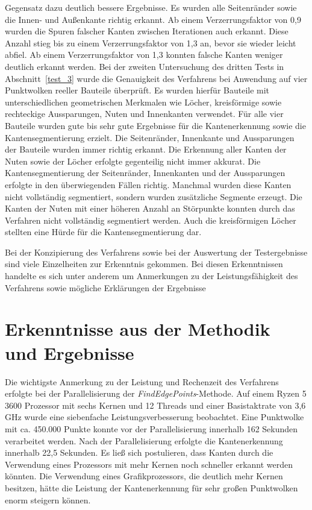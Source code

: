 Gegensatz dazu deutlich bessere Ergebnisse. Es wurden alle Seitenränder sowie die Innen- und Außenkante richtig erkannt. Ab einem Verzerrungsfaktor von 0,9 wurden die Spuren falscher Kanten zwischen Iterationen auch erkannt. Diese Anzahl stieg bis zu einem Verzerrungsfaktor von 1,3 an, bevor sie wieder leicht abfiel. Ab einem Verzerrungsfaktor von 1,3 konnten falsche Kanten weniger deutlich erkannt werden. Bei der zweiten Untersuchung des dritten Tests in Abschnitt~\ref{test_3} wurde die Genauigkeit des Verfahrens bei Anwendung auf vier Punktwolken reeller Bauteile überprüft. Es wurden hierfür Bauteile mit unterschiedlichen geometrischen Merkmalen wie Löcher, kreisförmige sowie rechteckige Aussparungen, Nuten und Innenkanten verwendet. Für alle vier Bauteile wurden gute bis sehr gute Ergebnisse für die Kantenerkennung sowie die Kantensegmentierung erzielt. Die Seitenränder, Innenkante und Aussparungen der Bauteile wurden immer richtig erkannt. Die Erkennung aller Kanten der Nuten sowie der Löcher erfolgte gegenteilig nicht immer akkurat. Die Kantensegmentierung der Seitenränder, Innenkanten und der Aussparungen erfolgte in den überwiegenden Fällen richtig. Manchmal wurden diese Kanten nicht vollständig segmentiert, sondern wurden zusätzliche Segmente erzeugt. Die Kanten der Nuten mit einer höheren Anzahl an Störpunkte konnten durch das Verfahren nicht vollständig segmentiert werden. Auch die kreisförmigen Löcher stellten eine Hürde für die Kantensegmentierung dar. 

Bei der Konzipierung des Verfahrens sowie bei der Auswertung der Testergebnisse sind viele Einzelheiten zur Erkenntnis gekommen. Bei diesen Erkenntnissen handelte es sich unter anderem um Anmerkungen zu der Leistungsfähigkeit des Verfahrens sowie mögliche Erklärungen der Ergebnisse

\section{Erkenntnisse aus der Methodik und Ergebnisse} \label{Erkenntnisse}

Die wichtigste Anmerkung zu der Leistung und Rechenzeit des Verfahrens erfolgte bei der Parallelisierung der \textit{FindEdgePoints}-Methode. Auf einem Ryzen 5 3600 Prozessor \autocite{noauthor_amd_2022} mit sechs Kernen und 12 Threads und einer Basistaktrate von 3,6 GHz wurde eine siebenfache Leistungsverbesserung beobachtet. Eine Punktwolke mit ca. 450.000 Punkte konnte vor der Parallelisierung innerhalb 162 Sekunden verarbeitet werden. Nach der Parallelisierung erfolgte die Kantenerkennung innerhalb 22,5 Sekunden. Es ließ sich postulieren, dass Kanten durch die Verwendung eines Prozessors mit mehr Kernen noch schneller erkannt werden könnten. Die Verwendung eines Grafikprozessors, die deutlich mehr Kernen besitzen, hätte die Leistung der Kantenerkennung für sehr großen Punktwolken enorm steigern können.

